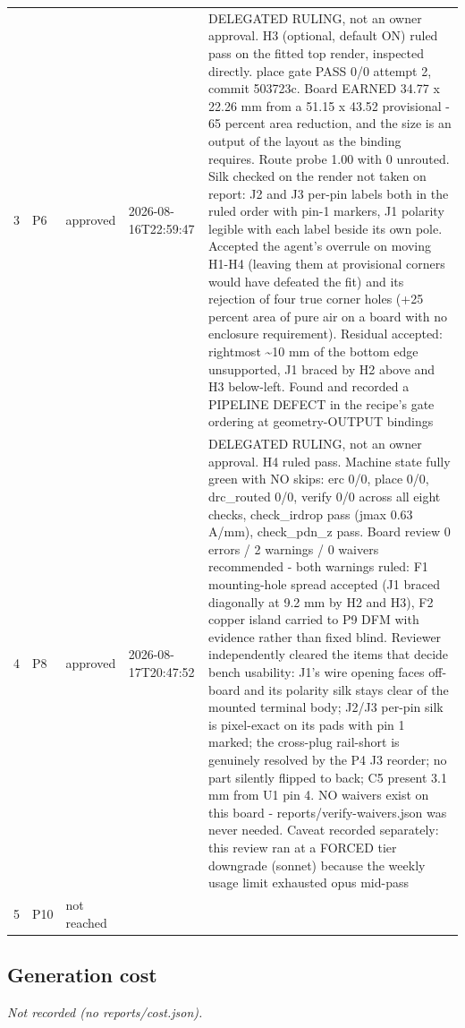 \documentclass[11pt,a4paper]{article}
\begin{document}
{\begin{longtable}{lllp{2.6cm}p{6.4cm}}
3 & P6 & approved & 2026-08-16T22:59:47 & DELEGATED RULING, not an owner approval. H3 (optional, default ON) ruled pass on the fitted top render, inspected directly. place gate PASS 0/0 attempt 2, commit 503723c. Board EARNED 34.77 x 22.26 mm from a 51.15 x 43.52 provisional - 65 percent area reduction, and the size is an output of the layout as the binding requires. Route probe 1.00 with 0 unrouted. Silk checked on the render not taken on report: J2 and J3 per-pin labels both in the ruled order with pin-1 markers, J1 polarity legible with each label beside its own pole. Accepted the agent's overrule on moving H1-H4 (leaving them at provisional corners would have defeated the fit) and its rejection of four true corner holes (+25 percent area of pure air on a board with no enclosure requirement). Residual accepted: rightmost \textasciitilde{}10 mm of the bottom edge unsupported, J1 braced by H2 above and H3 below-left. Found and recorded a PIPELINE DEFECT in the recipe's gate ordering at geometry-OUTPUT bindings \\
4 & P8 & approved & 2026-08-17T20:47:52 & DELEGATED RULING, not an owner approval. H4 ruled pass. Machine state fully green with NO skips: erc 0/0, place 0/0, drc\_routed 0/0, verify 0/0 across all eight checks, check\_irdrop pass (jmax 0.63 A/mm), check\_pdn\_z pass. Board review 0 errors / 2 warnings / 0 waivers recommended - both warnings ruled: F1 mounting-hole spread accepted (J1 braced diagonally at 9.2 mm by H2 and H3), F2 copper island carried to P9 DFM with evidence rather than fixed blind. Reviewer independently cleared the items that decide bench usability: J1's wire opening faces off-board and its polarity silk stays clear of the mounted terminal body; J2/J3 per-pin silk is pixel-exact on its pads with pin 1 marked; the cross-plug rail-short is genuinely resolved by the P4 J3 reorder; no part silently flipped to back; C5 present 3.1 mm from U1 pin 4. NO waivers exist on this board - reports/verify-waivers.json was never needed. Caveat recorded separately: this review ran at a FORCED tier downgrade (sonnet) because the weekly usage limit exhausted opus mid-pass \\
5 & P10 & not reached &  &  \\
\bottomrule
\end{longtable}
}
\subsection*{Generation cost}
\emph{Not recorded (no reports/cost.json).}
\end{document}
